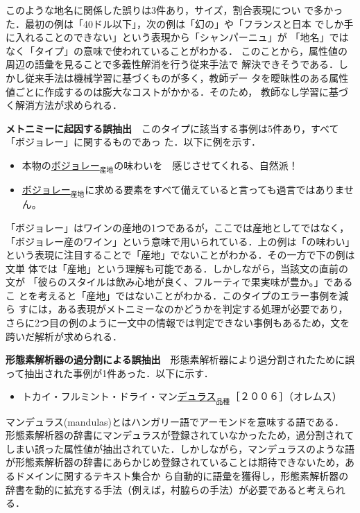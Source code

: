 \documentclass[japanese]{jnlp_1.4}
\begin{document}
\noindent このような地名に関係した誤りは3件あり，サイズ，割合表現につい
で多かった．最初の例は「40ドル以下」，次の例は「幻の」や「フランスと日本
でしか手に入れることのできない」という表現から「シャンパーニュ」が
「地名」ではなく「タイプ」の意味で使われていることがわかる．
このことから，属性値の周辺の語彙を見ることで多義性解消を行う従来手法で
解決できそうである．しかし従来手法は機械学習に基づくものが多く，教師デー
タを曖昧性のある属性値ごとに作成するのは膨大なコストがかかる．そのため，
教師なし学習に基づく解消方法が求められる．



\vspace{1\Cvs}
\noindent
\textbf{メトニミーに起因する誤抽出}　このタイプに該当する事例は5件あり，すべて「ボジョレー」に関するものであっ
た．以下に例を示す．

\begin{itemize}
\item 本物の\underline{ボジョレー}$_{産地}$の味わいを　感じさせてくれる、自然派！
\item \underline{ボジョレー}$_{産地}$に求める要素をすべて備えていると言っても過言ではありません。
\end{itemize}

\noindent
「ボジョレー」はワインの産地の1つであるが，ここでは産地としてではなく，
「ボジョレー産のワイン」という意味で用いられている．上の例は「の味わい」
という表現に注目することで「産地」でないことがわかる．その一方で下の例は文単
体では「産地」という理解も可能である．しかしながら，当該文の直前の文が
「彼らのスタイルは飲み心地が良く、フルーティで果実味が豊か。」であるこ
とを考えると「産地」ではないことがわかる．このタイプのエラー事例を減ら
すには，ある表現がメトニミーなのかどうかを判定する処理が必要であり，さらに2つ目の例のように一文中の情報では判定できない事例もあるため，文を跨いだ解析が求められる．


\vspace{1\Cvs}
\noindent
\textbf{形態素解析器の過分割による誤抽出}　形態素解析器により過分割されたために誤って抽出された事例が1件あった．以下に示す．

\begin{itemize}
\item トカイ・フルミント・ドライ・マン\underline{デュラス}$_{品種}$［２００６］（オレムス）
\end{itemize}

\noindent
マンデュラス(mandulas)とはハンガリー語でアーモンドを意味する語である．
形態素解析器の辞書にマンデュラスが登録されていなかったため，過分割されて
しまい誤った属性値が抽出されていた．しかしながら，マンデュラスのような語が形態素解析器の辞書にあらかじめ登録されていることは期待できないため，あるドメインに関するテキスト集合か
ら自動的に語彙を獲得し，形態素解析器の辞書を動的に拡充する手法（例えば，村脇らの手法\cite{murawaki2010}）が必要であると考えられる．
\end{document}
